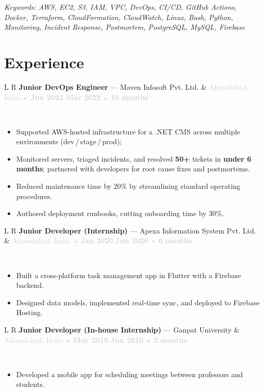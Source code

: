 \documentclass[11pt,a4paper]{article}
\newcommand{\dotnet}{\mbox{.NET}}
\newcommand{\xpheader}[5]{%
  {\normalsize\noindent\begin{tabularx}{\textwidth}{L R}
    \textbf{#1} — #2 & \textcolor{lightgray}{#3 • #4 • #5}\\
  \end{tabularx}}\\[-4pt]}
\newenvironment{tightitemize}{\vspace*{-\parskip}\begin{itemize}[leftmargin=*, topsep=0pt, itemsep=0pt, parsep=0pt, partopsep=0pt]\RaggedRight}{\end{itemize}}
\begin{document}
{\footnotesize\textit{Keywords: AWS, EC2, S3, IAM, VPC, DevOps, CI/CD, GitHub Actions, Docker, Terraform, CloudFormation, CloudWatch, Linux, Bash, Python, Monitoring, Incident Response, Postmortem, PostgreSQL, MySQL, Firebase}}

\section*{Experience}

\xpheader{\textbf{Junior DevOps Engineer}}{Maven\- Infosoft\- Pvt.\- Ltd.}{Ahmedabad, India}{\textbf{Jun 2021} \textendash{} \textbf{Mar 2022}}{\textbf{10 months}}
    \begin{tightitemize}
    \item Supported AWS-hosted infrastructure for a \dotnet{} CMS across multiple environments (dev\,/\,stage\,/\,prod);
    \item Monitored servers, triaged incidents, and resolved \textbf{50+} tickets in \textbf{under 6 months}; partnered with developers for root cause fixes and postmortems.
    \item Reduced maintenance time by 20\% by streamlining standard operating procedures.
    \item Authored deployment runbooks, cutting onboarding time by 30\%.
\end{tightitemize}
\vspace{1pt}

\xpheader{\textbf{Junior Developer (Internship)}}{Apexa\- Information\- System\- Pvt.\- Ltd.}{Ahmedabad, India}{\textbf{Jan 2020} \textendash{} \textbf{Jun 2020}}{\textbf{6 months}}
    \begin{tightitemize}
    \item Built a cross-platform task management app in Flutter with a Firebase backend.
    \item Designed data models, implemented real-time sync, and deployed to Firebase Hosting.
\end{tightitemize}
\vspace{1pt}

\xpheader{\textbf{Junior Developer (In-house Internship)}}{Ganpat University}{Ahmedabad, India}{\textbf{May 2019} \textendash{} \textbf{Jun 2019}}{\textbf{2 months}}
    \begin{tightitemize}
    \item Developed a mobile app for scheduling meetings between professors and students.
\end{tightitemize}
\end{document}
